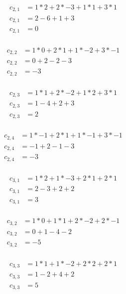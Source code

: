 \documentclass[12pt]{article}
\begin{document}
\begin{itemize}
\begin{align*}
    c_{2,1} &= 1 * 2 + 2 * -3 + 1 * 1 + 3 * 1 \\
    c_{2,1} &= 2 - 6 + 1 + 3 \\
    c_{2,1} &= 0 \\
\end{align*}

\begin{align*}
    c_{2,2} &= 1 * 0 + 2 * 1 + 1 * -2 + 3 * -1 \\
    c_{2,2} &= 0 + 2 - 2 - 3 \\
    c_{2,2} &= -3 \\
\end{align*}

\begin{align*}
    c_{2,3} &= 1 * 1 + 2 * -2 + 1 * 2 + 3 * 1 \\
    c_{2,3} &= 1 - 4 + 2 + 3 \\
    c_{2,3} &= 2 \\
\end{align*}

\begin{align*}
    c_{2,4} &= 1 * -1 + 2 * 1 + 1 * -1 + 3 * -1 \\
    c_{2,4} &= -1 + 2 - 1 - 3 \\
    c_{2,4} &= -3 \\
\end{align*}

\begin{align*}
    c_{3,1} &= 1 * 2 + 1 * -3 + 2 * 1 + 2 * 1 \\
    c_{3,1} &= 2 - 3 + 2 + 2 \\
    c_{3,1} &= 3  \\
\end{align*}

\begin{align*}
    c_{3,2} &= 1 * 0 + 1 * 1 + 2 * -2 + 2 * -1 \\
    c_{3,2} &= 0 + 1 - 4 - 2 \\
    c_{3,2} &= -5  \\
\end{align*}

\begin{align*}
    c_{3,3} &= 1 * 1 + 1 * -2 + 2 * 2 + 2 * 1 \\
    c_{3,3} &= 1 - 2 + 4 + 2 \\
    c_{3,3} &= 5  \\
\end{align*}


\end{itemize}
\end{document}
